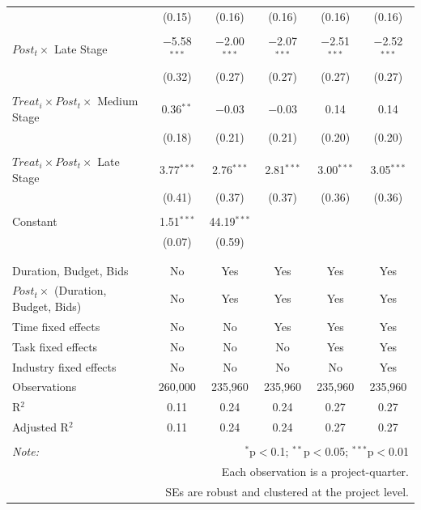 \documentclass[
]{article}
\begin{document}
\begin{table}[H]
\begin{tabular}{@{\extracolsep{-2pt}}lccccc}
  & (0.15) & (0.16) & (0.16) & (0.16) & (0.16) \\ 
  & & & & & \\ 
 $Post_t \times$ Late Stage & $-$5.58$^{***}$ & $-$2.00$^{***}$ & $-$2.07$^{***}$ & $-$2.51$^{***}$ & $-$2.52$^{***}$ \\ 
  & (0.32) & (0.27) & (0.27) & (0.27) & (0.27) \\ 
  & & & & & \\ 
 $Treat_i \times Post_t \times$ Medium Stage & 0.36$^{**}$ & $-$0.03 & $-$0.03 & 0.14 & 0.14 \\ 
  & (0.18) & (0.21) & (0.21) & (0.20) & (0.20) \\ 
  & & & & & \\ 
 $Treat_i \times Post_t \times$ Late Stage & 3.77$^{***}$ & 2.76$^{***}$ & 2.81$^{***}$ & 3.00$^{***}$ & 3.05$^{***}$ \\ 
  & (0.41) & (0.37) & (0.37) & (0.36) & (0.36) \\ 
  & & & & & \\ 
 Constant & 1.51$^{***}$ & 44.19$^{***}$ &  &  &  \\ 
  & (0.07) & (0.59) &  &  &  \\ 
  & & & & & \\ 
\hline \\[-1.8ex] 
Duration, Budget, Bids & No & Yes & Yes & Yes & Yes \\ 
$Post_t \times $  (Duration, Budget, Bids) & No & Yes & Yes & Yes & Yes \\ 
Time fixed effects & No & No & Yes & Yes & Yes \\ 
Task fixed effects & No & No & No & Yes & Yes \\ 
Industry fixed effects & No & No & No & No & Yes \\ 
Observations & 260,000 & 235,960 & 235,960 & 235,960 & 235,960 \\ 
R$^{2}$ & 0.11 & 0.24 & 0.24 & 0.27 & 0.27 \\ 
Adjusted R$^{2}$ & 0.11 & 0.24 & 0.24 & 0.27 & 0.27 \\ 
\hline 
\hline \\[-1.8ex] 
\textit{Note:}  & \multicolumn{5}{r}{$^{*}$p$<$0.1; $^{**}$p$<$0.05; $^{***}$p$<$0.01} \\ 
 & \multicolumn{5}{r}{Each observation is a project-quarter.} \\ 
 & \multicolumn{5}{r}{SEs are robust and clustered at the project level.} \\ 
\end{tabular} 
\end{table}
\end{document}
